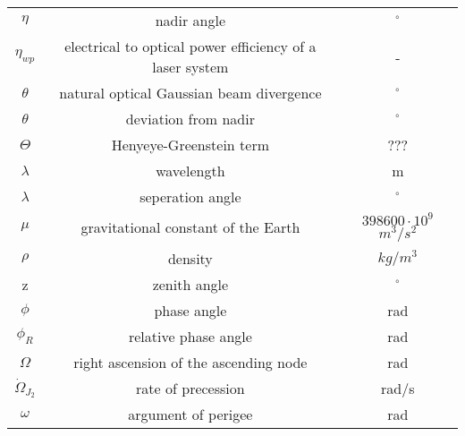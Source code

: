 \begin{center}
\begin{longtable}{c|c|c}
$\eta$ 															& nadir angle																															& $^\circ$ \\

$\eta_{wp}$                       	& electrical to optical power efficiency of a laser system  							& - \\

$\theta$                            & natural optical Gaussian beam divergence       													& $^\circ$ \\

$\theta$                            & deviation from nadir                             												&  $^\circ$ \\

$\Theta$                            & Henyeye-Greenstein term                           											&  ??? \\

$\lambda$ 													& wavelength																															& m \\

$\lambda$ 													& seperation angle																												& $^\circ$ \\ 

$\mu$														 		& gravitational constant of the Earth 																		& $398600\cdot 10^9$ $m^3/s^2$ \\

$\rho$ 															& density 																																& $kg/m^3$ \\

z                             			& zenith angle                                  													& $^\circ$ \\     

$\phi$ 															& phase angle 																														& rad \\
	
$\phi _R$														& relative phase angle 																										& rad \\
     
$\Omega$ 														& right ascension of the ascending node 																	& rad \\

$\dot \Omega _{J_2 }$ 							& rate of precession 																											& rad/s \\

$\omega$ 														& argument of perigee																											& rad \\


\end{longtable}
\end{center}
